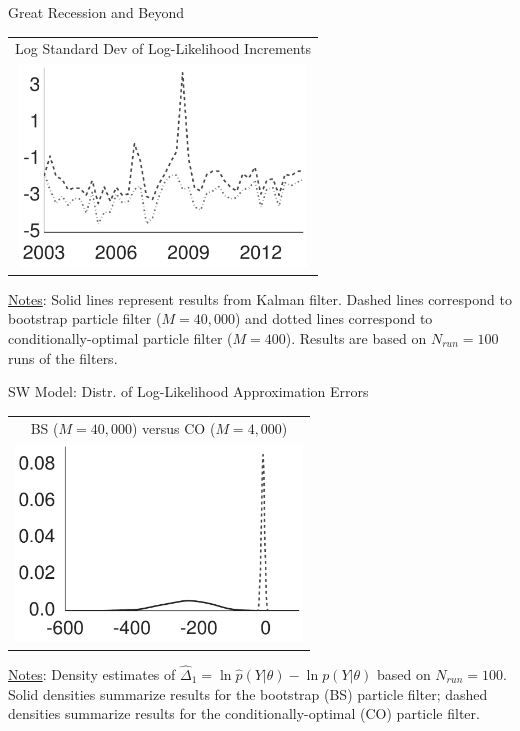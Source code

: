 \documentclass[presentation]{beamer}
\begin{document}
\begin{frame}[label={sec:org4284cfa}]{Great Recession and Beyond}
\begin{center}
	\begin{tabular}{c}
    Log Standard Dev of Log-Likelihood Increments \\
    \includegraphics[width=3in]{dsge1_me_great_recession_lnpy_lnstd.pdf} 
\end{tabular}
\end{center}
\uline{Notes}: Solid lines represent results from Kalman
filter. Dashed lines correspond to bootstrap particle filter
(\(M=40,000\)) and dotted lines correspond to
conditionally-optimal particle filter (\(M=400\)). Results are
based on \(N_{run}=100\) runs of the filters.
\end{frame}

\begin{frame}[label={sec:orga89a475}]{SW Model: Distr. of Log-Likelihood Approximation Errors}
\begin{center}
	\begin{tabular}{c}
		BS ($M=40,000$) versus CO ($M=4,000$) \\
		\includegraphics[width=3in]{sw_me_paramax_lnlhbias.pdf}
	\end{tabular}
\end{center}
\uline{Notes}: Density estimates of \(\hat{\Delta}_1 = \ln \hat{p}(Y|\theta)- \ln p(Y|\theta)\) based on \(N_{run}=100\).
Solid densities summarize results for the bootstrap (BS) particle filter;
dashed densities summarize results for the conditionally-optimal (CO) particle filter.
\end{frame}
\end{document}
